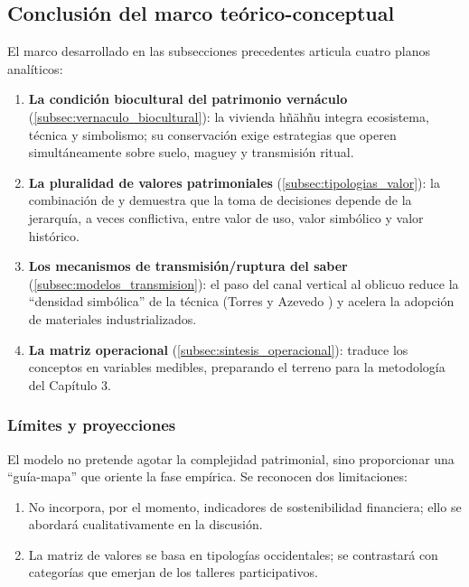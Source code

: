 \subsection{Conclusión del marco teórico-conceptual}

El marco desarrollado en las subsecciones precedentes articula cuatro
planos analíticos:

\begin{enumerate}
	\item \textbf{La condición biocultural del patrimonio vernáculo}
	      (\ref{subsec:vernaculo_biocultural}): la vivienda hñähñu
	      integra ecosistema, técnica y simbolismo; su conservación exige
	      estrategias que operen simultáneamente sobre suelo, maguey y
	      transmisión ritual.
	\item \textbf{La pluralidad de valores patrimoniales}
	      (\ref{subsec:tipologias_valor}): la combinación de
	      \cite{riegl1903} y \cite{delatorre2002values} demuestra que la toma de decisiones
	      depende de la jerarquía, a veces conflictiva, entre valor de
	      uso, valor simbólico y valor histórico.
	\item \textbf{Los mecanismos de transmisión/ruptura del saber}
	      (\ref{subsec:modelos_transmision}): el paso del canal vertical
	      al oblicuo reduce la ``densidad simbólica'' de la técnica
	      (Torres y Azevedo \citeyear{torres2021transmision}) y acelera la
	      adopción de materiales industrializados.
	\item \textbf{La matriz operacional} (\ref{subsec:sintesis_operacional}):
	      traduce los conceptos en variables medibles,
	      preparando el terreno para la metodología del Capítulo 3.
\end{enumerate}

\subsubsection{Límites y proyecciones}

El modelo no pretende agotar la complejidad patrimonial, sino
proporcionar una ``guía-mapa'' que oriente la fase empírica.
Se reconocen dos limitaciones:

\begin{enumerate}
	\item No incorpora, por el momento, indicadores de
	      sostenibilidad financiera; ello se abordará
	      cualitativamente en la discusión.
	\item La matriz de valores se basa en tipologías occidentales; se
	      contrastará con categorías que emerjan de los talleres
	      participativos.
\end{enumerate}
